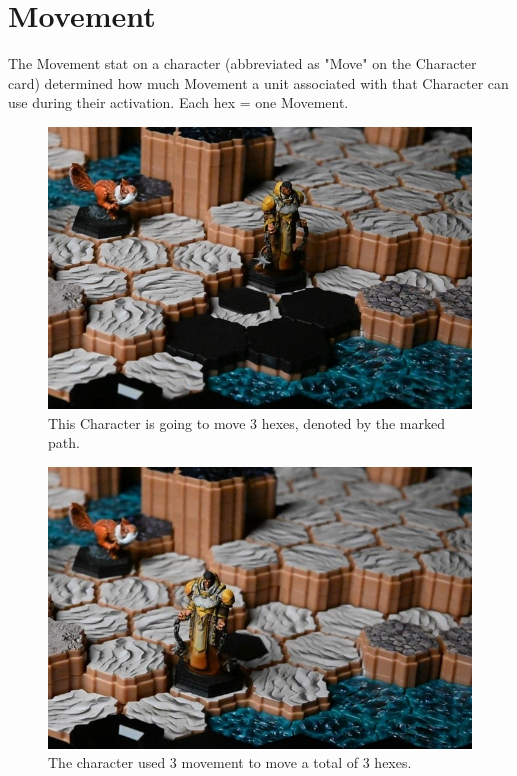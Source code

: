 \documentclass[../main.tex]{subfiles}
\begin{document}
\section{Movement}
The Movement stat on a character (abbreviated as "Move" on the Character card) determined how much Movement a unit associated with that Character can use during their activation. Each hex = one Movement. 

\begin{figure}[h]
    \centering
    \includegraphics[width=1\linewidth]{chapters//Movement/TimeStrikeMovement1.jpg}
    \caption{This Character is going to move 3 hexes, denoted by the marked path.}
\end{figure}

\begin{figure}[h]
    \centering
    \includegraphics[width=1\linewidth]{chapters//Movement/TimeStrikeMovement2.jpg}
    \caption{The character used 3 movement to move a total of 3 hexes.}
\end{figure}
\end{document}
